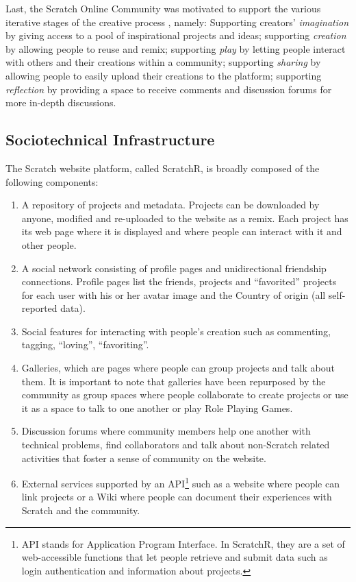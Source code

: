 Last, the Scratch Online Community was motivated to support the various iterative stages of the creative process \citep{resnick_sowing_2008}, namely:
Supporting creators' \emph{imagination} by giving access to a pool of inspirational projects and ideas; supporting \emph{creation} by allowing people to reuse and remix; supporting \emph{play} by letting people interact with others and their creations within a community; supporting \emph{sharing} by allowing people to easily upload their creations to the platform; supporting \emph{reflection} by providing a space to receive comments and discussion forums for more in-depth discussions.

\subsection{Sociotechnical Infrastructure}
The Scratch website platform, called ScratchR, is broadly composed of the following components: 

\begin{enumerate}
\item A repository of projects and metadata. Projects can be downloaded by anyone, modified and re-uploaded to the website as a remix. Each project has its web page where it is displayed and where people can interact with it and other people. 

\item A social network consisting of profile pages and unidirectional friendship connections. Profile pages list the friends, projects and ``favorited'' projects for each user with his or her avatar image and the Country of origin (all self-reported data).

\item Social features for interacting with people's creation such as commenting, tagging, ``loving'', ``favoriting''.

\item Galleries, which are pages where people can group projects and talk about them. It is important to note that galleries have been repurposed by the community as group spaces where people collaborate to create projects or use it as a space to talk to one another or play Role Playing Games.

\item Discussion forums where community members help one another with technical problems, find collaborators and talk about non-Scratch related activities that foster a sense of community on the website.

\item External services supported by an API\footnote{API stands for Application Program Interface. In ScratchR, they are a set of web-accessible functions that let people retrieve and submit data such as login authentication and information about projects.} such as a website where people can link projects or a Wiki where people can document their experiences with Scratch and the community.
\end{enumerate}

